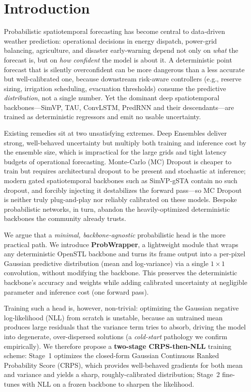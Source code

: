 
\section{Introduction}
\label{sec:intro}

Probabilistic spatiotemporal forecasting has become central to data-driven weather prediction: operational decisions in energy dispatch, power-grid balancing, agriculture, and disaster early-warning depend not only on \emph{what} the forecast is, but on \emph{how confident} the model is about it.
A deterministic point forecast that is silently overconfident can be more dangerous than a less accurate but well-calibrated one, because downstream risk-aware controllers (e.g., reserve sizing, irrigation scheduling, evacuation thresholds) consume the predictive \emph{distribution}, not a single number.
Yet the dominant deep spatiotemporal backbones---SimVP, TAU, ConvLSTM, PredRNN and their descendants---are trained as deterministic regressors and emit no usable uncertainty.

Existing remedies sit at two unsatisfying extremes.
Deep Ensembles deliver strong, well-behaved uncertainty but multiply both training and inference cost by the ensemble size, which is impractical for the large grids and tight latency budgets of operational forecasting.
Monte-Carlo (MC) Dropout is cheaper to train but requires architectural dropout to be present and stochastic at inference; modern gated spatiotemporal backbones such as SimVP-gSTA contain no such dropout, and forcibly injecting it destabilizes the forward pass---so MC Dropout is neither truly plug-and-play nor reliably calibrated on these models.
Bespoke probabilistic networks, in turn, abandon the heavily-optimized deterministic backbones the community already trusts.

We argue that a \emph{minimal, backbone-agnostic} probabilistic head is the more practical path.
We introduce \textbf{ProbWrapper}, a lightweight module that wraps any deterministic OpenSTL backbone and turns its frame output into a per-pixel Gaussian predictive distribution (mean and log-variance) via a single $1\times1$ convolution, without modifying the backbone.
This preserves the deterministic backbone's accuracy and weights while adding calibrated uncertainty at negligible parameter and inference cost (one forward pass).

Training such a head is, however, non-trivial: optimizing the Gaussian negative log-likelihood (NLL) from scratch is unstable, because an untrained mean produces large residuals that the variance term tries to absorb, driving the model into degenerate, over-dispersed solutions (a \emph{cold-start} pathology we confirm empirically).
We therefore propose a \textbf{two-stage CRPS-then-NLL} training scheme: Stage~1 optimizes the closed-form Gaussian Continuous Ranked Probability Score (CRPS), which provides well-behaved gradients for both mean and variance and yields a sharp, roughly-calibrated distribution; Stage~2 fine-tunes with NLL on a frozen backbone to sharpen the likelihood.

